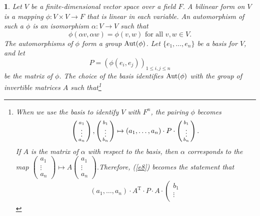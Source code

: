\documentclass[a4paper,11pt,final,openany]{memoir}%
\newtheorem{plain}[X]{}
\theoremstyle{nonumberplain}
\begin{document}
\begin{plain}
\label{bd3f}Let $V$ be a finite-dimensional vector space over a field $F$. A
bilinear form on $V$ is a mapping $\phi\colon V\times V\rightarrow F$ that is
linear in each variable. An \emph{automorphism}%
of such a $\phi$ is an isomorphism $\alpha\colon V\rightarrow V$ such that%
\begin{equation}
\phi(\alpha v,\alpha w)=\phi(v,w)\text{ for all }v,w\in V. \label{e8}%
\end{equation}
The automorphisms of $\phi$ form a group $\operatorname{Aut}(\phi)$. Let $\{e_{1}%
,\ldots,e_{n}\}$ be a basis for $V$, and let%
\[
P=(\phi(e_{i},e_{j}))_{1\leq i,j\leq n}%
\]
be the matrix of $\phi$. The choice of the basis identifies $\operatorname{Aut}(\phi)$ with
the group of invertible matrices $A$ such that\footnote{When we use the basis
to identify $V$ with $F^{n}$, the pairing $\phi$ becomes%
\[
\left(
\begin{smallmatrix}
\vphantom{b}a_{1}\\
\vdots\\
\vphantom{b}a_{n}%
\end{smallmatrix}
\right)  ,\left(
\begin{smallmatrix}
b_{1}\\
\vdots\\
b_{n}%
\end{smallmatrix}
\right)  \mapsto(a_{1},\ldots,a_{n})\cdot P\cdot\left(
\begin{smallmatrix}
b_{1}\\
\vdots\\
b_{n}%
\end{smallmatrix}
\right)  .
\]
If $A$ is the matrix of $\alpha$ with respect to the basis, then $\alpha$
corresponds to the map $\left(
\begin{smallmatrix}
a_{1}\\
\vdots\\
a_{n}%
\end{smallmatrix}
\right)  \mapsto A\left(
\begin{smallmatrix}
a_{1}\\
\vdots\\
a_{n}%
\end{smallmatrix}
\right)  .$Therefore, (\ref{e8}) becomes the statement that%
\begin{align*}
(a_{1},\ldots,a_{n})\cdot A^{\mathrm{T}}\cdot P\cdot A\cdot\left(
\begin{smallmatrix}
b_{1}\\
\vdots\\

\end{smallmatrix}
\end{align*}}
\end{plain}
\end{document}
